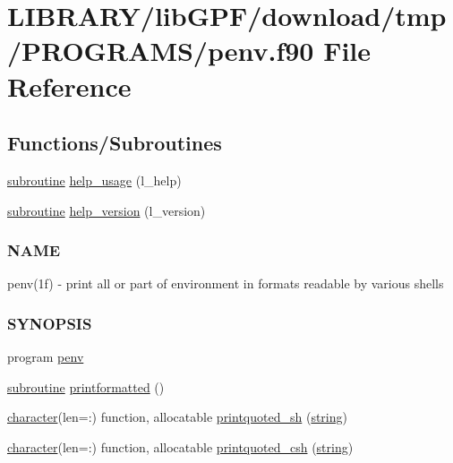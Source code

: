 \hypertarget{penv_8f90}{}\section{L\+I\+B\+R\+A\+R\+Y/lib\+G\+P\+F/download/tmp/\+P\+R\+O\+G\+R\+A\+M\+S/penv.f90 File Reference}
\label{penv_8f90}
\subsection*{Functions/\+Subroutines}
\begin{DoxyCompactItemize}
\item 
\hyperlink{M__stopwatch_83_8txt_acfbcff50169d691ff02d4a123ed70482}{subroutine} \hyperlink{penv_8f90_a3e09a3b52ee8fb04eeb93fe5761626a8}{help\+\_\+usage} (l\+\_\+help)
\item 
\hyperlink{M__stopwatch_83_8txt_acfbcff50169d691ff02d4a123ed70482}{subroutine} \hyperlink{penv_8f90_a39c21619b08a3c22f19e2306efd7f766}{help\+\_\+version} (l\+\_\+version)
\begin{DoxyCompactList}\small\item\em \subsubsection*{N\+A\+ME}

penv(1f) -\/ print all or part of environment in formats readable by various shells \subsubsection*{S\+Y\+N\+O\+P\+S\+IS}\end{DoxyCompactList}\item 
program \hyperlink{penv_8f90_a01dea0dd27ab167506a724b2d0aeb2b5}{penv}
\item 
\hyperlink{M__stopwatch_83_8txt_acfbcff50169d691ff02d4a123ed70482}{subroutine} \hyperlink{penv_8f90_a53f464ba778289ef53d33f9c0e2130c0}{printformatted} ()
\item 
\hyperlink{option__stopwatch_83_8txt_abd4b21fbbd175834027b5224bfe97e66}{character}(len=\+:) function, allocatable \hyperlink{penv_8f90_a446969c8690f5c32006cd0ae899ce932}{printquoted\+\_\+sh} (\hyperlink{what__overview_81_8txt_a74cb7e955273b9f9157b4f0c18a38849}{string})
\item 
\hyperlink{option__stopwatch_83_8txt_abd4b21fbbd175834027b5224bfe97e66}{character}(len=\+:) function, allocatable \hyperlink{penv_8f90_a8352a8cad3a618a85c981f11beb23715}{printquoted\+\_\+csh} (\hyperlink{what__overview_81_8txt_a74cb7e955273b9f9157b4f0c18a38849}{string})
\end{DoxyCompactItemize}


